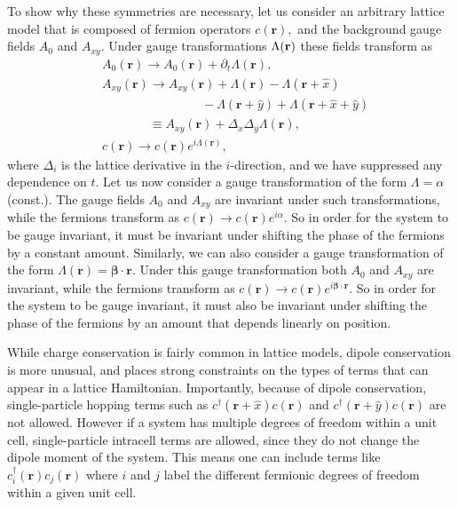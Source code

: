 \documentclass[prb,aps,twocolumn,groupaddress,floatfix]{revtex4-1}
\begin{document}
To show why these symmetries are necessary, let us consider an arbitrary lattice model that is composed of fermion operators $c(\bm{r}),$ and the background gauge fields $A_0$ and $A_{xy}.$
Under gauge transformations $\Lambda({\bf{r}})$ these fields transform as
\begin{equation}
\begin{split}
&A_{0}(\bm{r}) \rightarrow A_{0}(\bm{r}) + \partial_t \Lambda(\bm{r}),\\
&A_{xy}(\bm{r}) \rightarrow A_{xy}(\bm{r}) + \Lambda(\bm{r}) - \Lambda(\bm{r}+\hat{x}) \\ &\phantom{======}- \Lambda(\bm{r}+\hat{y}) + \Lambda(\bm{r}+\hat{x}+\hat{y})\\
&\phantom{A_{xy}(\bm{r}) }\equiv A_{xy}(\bm{r}) + \Delta_x \Delta_y \Lambda(\bm{r}),\\
&c(\bm{r}) \rightarrow  c(\bm{r}) e^{ i \Lambda(\bm{r})},
\end{split}\label{eq:GaugeTransDef}
\end{equation}
where $\Delta_i$ is the lattice derivative in the $i$-direction, and we have suppressed any dependence on $t$. Let us now consider a gauge transformation of the form $\Lambda = \alpha$ (const.). The gauge fields $A_0$ and $A_{xy}$ are invariant under such transformations, while the fermions transform as $c(\bm{r}) \rightarrow c(\bm{r})e^{i\alpha}$. So in order for the system to be gauge invariant, it must be invariant under shifting the phase of the fermions by a constant amount. Similarly, we can also consider a gauge transformation of the form $\Lambda(\bm{r}) = \bm{\beta}\cdot \bm{r}$. Under this gauge transformation both $A_0$ and $A_{xy}$ are invariant, while the fermions transform as $c(\bm{r})\rightarrow c(\bm{r}) e^{ i \bm{\beta}\cdot\bm{r}}$. So in order for the system to be gauge invariant, it must also be invariant under shifting the phase of the fermions by an amount that depends linearly on position.


While charge conservation is fairly common in lattice models, dipole conservation is more unusual, and places strong constraints on the types of terms that can appear in a lattice Hamiltonian. Importantly, because of dipole conservation, single-particle hopping terms such as  $c^{\dagger}(\bm{r}+\hat{x})c(\bm{r})$ and $c^{\dagger}(\bm{r}+\hat{y})c(\bm{r})$ are not allowed. However if a system has multiple degrees of freedom within a unit cell, single-particle intracell terms are allowed, since they do not change the dipole moment of the system. This means one can include terms like $c_{i}^{\dagger}(\bm{r})c_{j}(\bm{r})$ where $i$ and $j$ label the different fermionic degrees of freedom within a given unit cell. 
\end{document}
